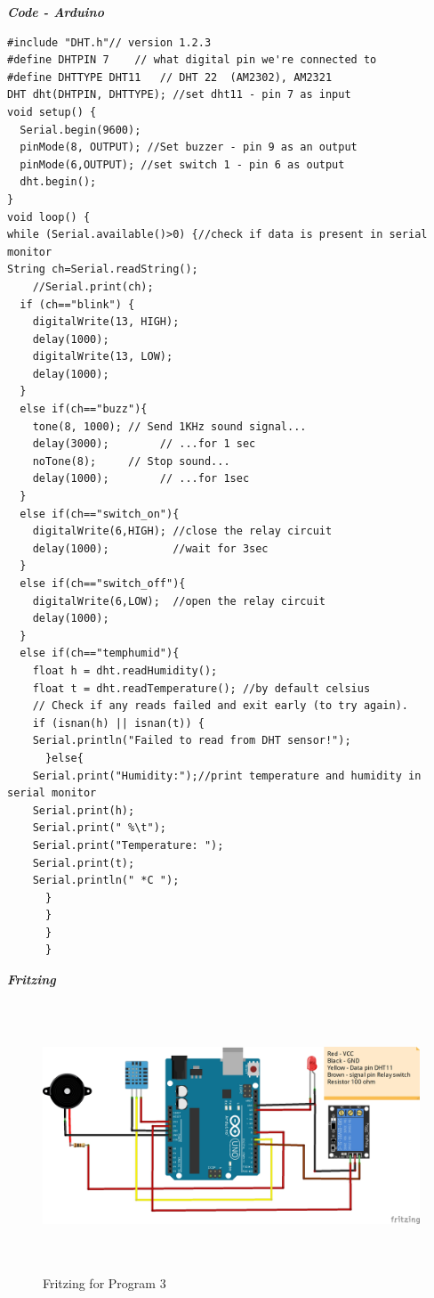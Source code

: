 \documentclass[12pt,a4paper]{article}
\begin{document}
\begin{flushleft}
\textbf{\textit{Code - Arduino}}
\begin{lstlisting}
#include "DHT.h"// version 1.2.3
#define DHTPIN 7    // what digital pin we're connected to
#define DHTTYPE DHT11   // DHT 22  (AM2302), AM2321
DHT dht(DHTPIN, DHTTYPE); //set dht11 - pin 7 as input
void setup() {
  Serial.begin(9600);
  pinMode(8, OUTPUT); //Set buzzer - pin 9 as an output
  pinMode(6,OUTPUT); //set switch 1 - pin 6 as output
  dht.begin();
}
void loop() {
while (Serial.available()>0) {//check if data is present in serial monitor
String ch=Serial.readString();
    //Serial.print(ch);
  if (ch=="blink") {
    digitalWrite(13, HIGH);
    delay(1000);
    digitalWrite(13, LOW);
    delay(1000);
  }
  else if(ch=="buzz"){
    tone(8, 1000); // Send 1KHz sound signal...
    delay(3000);        // ...for 1 sec
    noTone(8);     // Stop sound...
    delay(1000);        // ...for 1sec
  }
  else if(ch=="switch_on"){
    digitalWrite(6,HIGH); //close the relay circuit
    delay(1000);          //wait for 3sec
  }
  else if(ch=="switch_off"){
    digitalWrite(6,LOW);  //open the relay circuit
    delay(1000);
  }
  else if(ch=="temphumid"){
    float h = dht.readHumidity();
    float t = dht.readTemperature(); //by default celsius
    // Check if any reads failed and exit early (to try again).
    if (isnan(h) || isnan(t)) {
    Serial.println("Failed to read from DHT sensor!");
      }else{
    Serial.print("Humidity:");//print temperature and humidity in serial monitor
    Serial.print(h);
    Serial.print(" %\t");
    Serial.print("Temperature: ");
    Serial.print(t);
    Serial.println(" *C ");
      }   
      }  
      }  
      }
\end{lstlisting}
\clearpage
\textbf{\textit{Fritzing}} \\
\begin{figure}[h!]
    \centering
    \includegraphics[width=15cm, height=8cm]{Prog3.jpg}
    \caption{Fritzing for Program 3}
\end{figure}


\end{flushleft}
\end{document}

